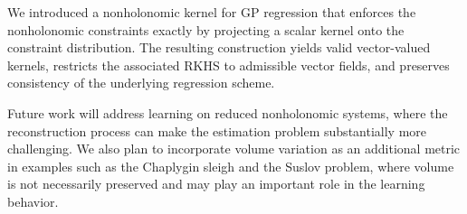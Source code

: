 \documentclass[letterpaper, 10 pt, conference]{ieeeconf}
\begin{document}
We introduced a nonholonomic kernel for GP regression that enforces the nonholonomic constraints exactly by projecting a scalar kernel onto the constraint distribution. The resulting construction yields valid vector-valued kernels, restricts the associated RKHS to admissible vector fields, and preserves consistency of the underlying regression scheme.

Future work will address learning on reduced nonholonomic systems, where the reconstruction process can make the estimation problem substantially more challenging. We also plan to incorporate volume variation as an additional metric in examples such as the Chaplygin sleigh and the Suslov problem, where volume is not necessarily preserved and may play an important role in the learning behavior.


\end{document}
